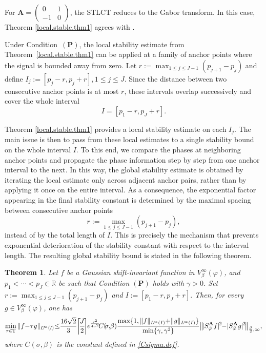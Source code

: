 \documentclass[11pt, reqno]{amsart}
\newtheorem{theorem}{Theorem}[section]
\numberwithin{equation}{section}
\begin{document}
For $
\mathbf{A}=
\begin{pmatrix}
0 & 1\\
-1 & 0
\end{pmatrix}$,
the STLCT reduces to the Gabor transform. In this case, Theorem \ref{local.stable.thm1} agrees with \cite[Lemma~3.8]{grohs2024stable}.

Under Condition~$(\mathbf P)$, the local stability estimate from Theorem~\ref{local.stable.thm1} can be applied at a family of anchor points where the signal is bounded away from zero. Let $ r:=\max_{1\le j\le J-1}(p_{j+1}-p_j)$ and define $ I_j:=[p_j-r,p_j+r],  1\le j\le J.$  Since the distance between two consecutive anchor points is at most $r$, these intervals overlap successively and cover the whole interval
$$ I=[p_1-r,p_J+r].$$ 


Theorem \ref{local.stable.thm1} provides a local stability estimate on each $I_j$.  The main issue is then to pass from these local estimates to a single stability bound on the whole interval $I$. To this end, we compare the phases at neighboring anchor points and propagate the phase information step by step from one anchor interval to the next. In this way, the global stability estimate is obtained by iterating the local estimate only across adjacent anchor pairs, rather than by applying it once on the entire interval. As a consequence, the exponential factor appearing in the final stability constant is determined by  the maximal spacing between consecutive anchor points
$$r:=\max_{1\le j\le J-1}(p_{j+1}-p_j),$$
 instead of by the total length of $I$. This is precisely the mechanism that prevents exponential deterioration of the stability constant with respect to the interval length. The resulting global stability bound is stated in the following theorem.


\begin{theorem}\label{stable.thm2}
Let $f$ be a Gaussian shift-invariant function in $V_\beta^\infty(\varphi)$, and 
$
p_1<\cdots<p_J\in\mathbb R$ 
be such that Condition $(\mathbf P)$ holds with $\gamma>0$. Set $
r:=\max_{1\le j\le J-1}(p_{j+1}-p_j)$ and $
I:=[p_1-r,p_J+r].$ 
Then, for every $g\in V_{\beta}^{\infty}(\varphi)$, one has
\begin{align}\label{stable.const}
\min_{\tau\in\mathbb T}\|f\hskip-.03in-\hskip-.03in\tau g\|_{L\hskip-.02in^\infty(\hskip-.01in I \hskip-.01in)}\hskip-.03in \le\hskip-.04in
\frac{16\sqrt{2}}{3} \hskip-.03in\left\lceil\hskip-.03in\frac{J}{2}\hskip-.03in\right\rceil \hskip-.03ine^{\frac{r^2}{4\sigma^2}}
\hskip-.03inC(\hskip-.03in\sigma,\hskip-.03in\beta)
\frac{\max\{1,\|f\|_{L\hskip-.02in^\infty(I)}\hskip-.03in+\hskip-.03in\|g\|_{L\hskip-.02in^\infty(I)}\}}{\min\{\gamma,\gamma^2\}}
\bigl\|\hskip-.02in|S_{\check{\varphi}}^{\mathbf A}f|\hskip-.01in^2\hskip-.04in-\hskip-.03in|S_{\check{\varphi}}^{\mathbf A}g|\hskip-.01in^2\hskip-.02in\bigr\|_{\frac{\beta}{2},\infty},
\end{align}
where $C(\sigma,\beta)$ is the constant defined in \eqref{Csigma.def}.
\end{theorem}
\end{document}
